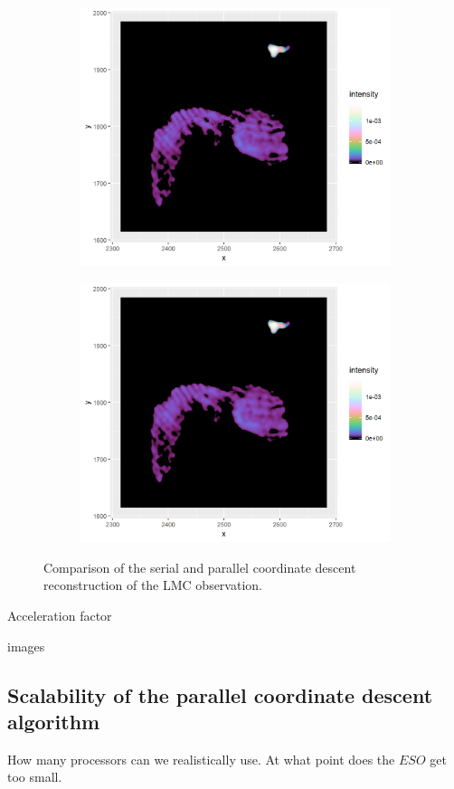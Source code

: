 \begin{figure}[h]
\begin{subfigure}{0.4\linewidth}
	\end{subfigure}
	\\
	\begin{subfigure}{0.4\linewidth}
		\centering
		\includegraphics[width=1.0\linewidth]{./chapters/05.pcdm/comparison/SerialCD-Calibration.png}
	\end{subfigure}
	\begin{subfigure}{0.4\linewidth}
		\centering
		\includegraphics[width=1.0\linewidth]{./chapters/05.pcdm/comparison/PCDM-Calibration.png}
	\end{subfigure}

	\caption{Comparison of the serial and parallel coordinate descent reconstruction of the LMC observation.}
	\label{pcdm:comparison:figure}
\end{figure}


Acceleration factor

images


\subsection{Scalability of the parallel coordinate descent algorithm}
How many processors can we realistically use. At what point does the $ESO$ get too small.




